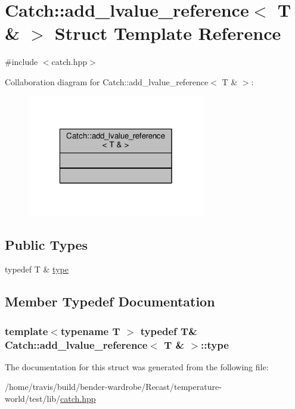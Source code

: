 \hypertarget{struct_catch_1_1add__lvalue__reference_3_01_t_01_6_01_4}{\section{Catch\-:\-:add\-\_\-lvalue\-\_\-reference$<$ T \& $>$ Struct Template Reference}
\label{struct_catch_1_1add__lvalue__reference_3_01_t_01_6_01_4}
}


{\ttfamily \#include $<$catch.\-hpp$>$}



Collaboration diagram for Catch\-:\-:add\-\_\-lvalue\-\_\-reference$<$ T \& $>$\-:
\nopagebreak
\begin{figure}[H]
\begin{center}
\leavevmode
\includegraphics[width=220pt]{struct_catch_1_1add__lvalue__reference_3_01_t_01_6_01_4__coll__graph}
\end{center}
\end{figure}
\subsection*{Public Types}
\begin{DoxyCompactItemize}
\item 
typedef T \& \hyperlink{struct_catch_1_1add__lvalue__reference_3_01_t_01_6_01_4_ae410743009a52c98fbb27f1b6fc7a886}{type}
\end{DoxyCompactItemize}


\subsection{Member Typedef Documentation}
\hypertarget{struct_catch_1_1add__lvalue__reference_3_01_t_01_6_01_4_ae410743009a52c98fbb27f1b6fc7a886}{
\subsubsection[{type}]{\setlength{\rightskip}{0pt plus 5cm}template$<$typename T $>$ typedef T\& {\bf Catch\-::add\-\_\-lvalue\-\_\-reference}$<$ T \& $>$\-::{\bf type}}}\label{struct_catch_1_1add__lvalue__reference_3_01_t_01_6_01_4_ae410743009a52c98fbb27f1b6fc7a886}


The documentation for this struct was generated from the following file\-:\begin{DoxyCompactItemize}
\item 
/home/travis/build/bender-\/wardrobe/\-Recast/temperature-\/world/test/lib/\hyperlink{catch_8hpp}{catch.\-hpp}\end{DoxyCompactItemize}
